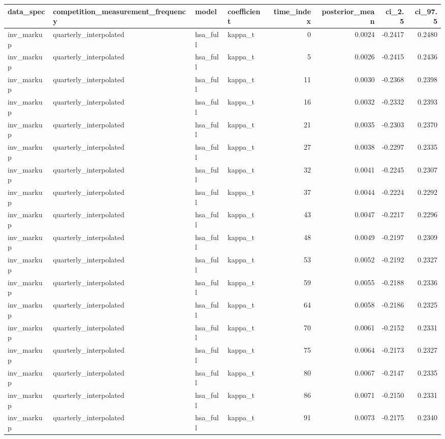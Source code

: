 \begin{tabular}{llllrrrr}
\toprule
data\_spec & competition\_measurement\_frequency & model & coefficient & time\_index & posterior\_mean & ci\_2.5 & ci\_97.5 \\
\midrule
inv\_markup & quarterly\_interpolated & hsa\_full & kappa\_t & 0 & 0.0024 & -0.2417 & 0.2480 \\
inv\_markup & quarterly\_interpolated & hsa\_full & kappa\_t & 5 & 0.0026 & -0.2415 & 0.2436 \\
inv\_markup & quarterly\_interpolated & hsa\_full & kappa\_t & 11 & 0.0030 & -0.2368 & 0.2398 \\
inv\_markup & quarterly\_interpolated & hsa\_full & kappa\_t & 16 & 0.0032 & -0.2332 & 0.2393 \\
inv\_markup & quarterly\_interpolated & hsa\_full & kappa\_t & 21 & 0.0035 & -0.2303 & 0.2370 \\
inv\_markup & quarterly\_interpolated & hsa\_full & kappa\_t & 27 & 0.0038 & -0.2297 & 0.2335 \\
inv\_markup & quarterly\_interpolated & hsa\_full & kappa\_t & 32 & 0.0041 & -0.2245 & 0.2307 \\
inv\_markup & quarterly\_interpolated & hsa\_full & kappa\_t & 37 & 0.0044 & -0.2224 & 0.2292 \\
inv\_markup & quarterly\_interpolated & hsa\_full & kappa\_t & 43 & 0.0047 & -0.2217 & 0.2296 \\
inv\_markup & quarterly\_interpolated & hsa\_full & kappa\_t & 48 & 0.0049 & -0.2197 & 0.2309 \\
inv\_markup & quarterly\_interpolated & hsa\_full & kappa\_t & 53 & 0.0052 & -0.2192 & 0.2327 \\
inv\_markup & quarterly\_interpolated & hsa\_full & kappa\_t & 59 & 0.0055 & -0.2188 & 0.2336 \\
inv\_markup & quarterly\_interpolated & hsa\_full & kappa\_t & 64 & 0.0058 & -0.2186 & 0.2325 \\
inv\_markup & quarterly\_interpolated & hsa\_full & kappa\_t & 70 & 0.0061 & -0.2152 & 0.2331 \\
inv\_markup & quarterly\_interpolated & hsa\_full & kappa\_t & 75 & 0.0064 & -0.2173 & 0.2327 \\
inv\_markup & quarterly\_interpolated & hsa\_full & kappa\_t & 80 & 0.0067 & -0.2147 & 0.2335 \\
inv\_markup & quarterly\_interpolated & hsa\_full & kappa\_t & 86 & 0.0071 & -0.2150 & 0.2331 \\
inv\_markup & quarterly\_interpolated & hsa\_full & kappa\_t & 91 & 0.0073 & -0.2175 & 0.2340 \\

\end{tabular}
